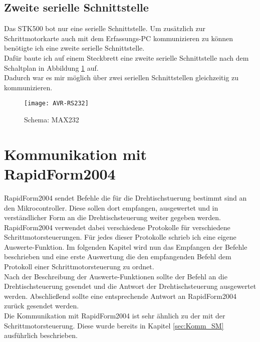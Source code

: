 \subsection{Zweite serielle Schnittstelle}
Das STK500 bot nur eine serielle Schnittstelle. Um zusätzlich zur Schrittmotorkarte auch mit dem Erfassungs-PC kommunizieren zu können benötigte ich eine zweite serielle Schnittstelle.\\
Dafür baute ich auf einem Steckbrett eine zweite serielle Schnittstelle nach dem Schaltplan in Abbildung \ref{fig:MAX232} auf.\\
Dadurch war es mir möglich über zwei seriellen Schnittstellen gleichzeitig zu kommunizieren.
\begin{figure}[h]
\centering
\texttt{[image: AVR-RS232]}
\caption{Schema: MAX232}
\label{fig:MAX232}
\citep{uC:RS232}
\end{figure}

\section{Kommunikation mit RapidForm2004}
\label{sec:Komm_RF2004}
RapidForm2004 sendet Befehle die für die Drehtischstuerung bestimmt sind an den Mikrocontroller. Diese sollen dort empfangen, ausgewertet und in verständlicher Form an die Drehtischsteuerung weiter gegeben werden. RapidForm2004 verwendet dabei verschiedene Protokolle für verschiedene Schrittmotorsteuerungen. Für jedes dieser Protokolle schrieb ich eine eigene Auswerte-Funktion. Im folgenden Kapitel wird nun das Empfangen der Befehle beschrieben und eine erste Auswertung die den empfangenden Befehl dem Protokoll einer Schrittmotorsteuerung zu ordnet.\\
Nach der Beschreibung der Auswerte-Funktionen sollte der Befehl an die Drehtischsteuerung gesendet und die Antwort der Drehtischsteuerung ausgewertet werden.
Abschließend sollte eine entsprechende Antwort an RapidForm2004 zurück gesendet werden. \\
Die Kommunikation mit RapidForm2004 ist sehr ähnlich zu der mit der Schrittmotorsteuerung. Diese wurde bereits in Kapitel \ref{sec:Komm_SM} ausführlich beschrieben. 

